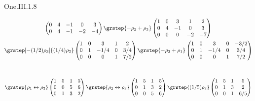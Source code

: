 \begin{ans}{One.III.1.8}
\begin{exparts}
\begin{multline*}
\begin{pmatrix}
              0  &4  &-1 &0  &3  \\
              0  &4  &-1 &-2 &-4
            \end{pmatrix}
            \grstep{-\rho_2+\rho_3}
            \begin{pmatrix}
              1  &0  &3  &1  &2  \\
              0  &4  &-1 &0  &3  \\
              0  &0  &0  &-2 &-7
            \end{pmatrix}                           \\
            \grstep[-(1/2)\rho_3]{(1/4)\rho_2}
            \begin{pmatrix}
              1  &0  &3    &1  &2  \\
              0  &1  &-1/4 &0  &3/4  \\
              0  &0  &0    &1  &7/2
            \end{pmatrix}
            \grstep{-\rho_3+\rho_1}
            \begin{pmatrix}
              1  &0  &3    &0  &-3/2  \\
              0  &1  &-1/4 &0  &3/4     \\
              0  &0  &0    &1  &7/2
            \end{pmatrix}
          \end{multline*}
        \partsitem \ \begin{multline*}
            \grstep{\rho_1\leftrightarrow\rho_3}
            \begin{pmatrix}
              1  &5  &1  &5  \\
              0  &0  &5  &6  \\
              0  &1  &3  &2
            \end{pmatrix}
            \grstep{\rho_2\leftrightarrow\rho_3}
            \begin{pmatrix}
              1  &5  &1  &5  \\
              0  &1  &3  &2  \\
              0  &0  &5  &6
            \end{pmatrix}
            \grstep{(1/5)\rho_3}
            \begin{pmatrix}
              1  &5  &1  &5  \\
              0  &1  &3  &2  \\
              0  &0  &1  &6/5
            \end{pmatrix}                  \\

\end{multline*}
\end{exparts}
\end{ans}
